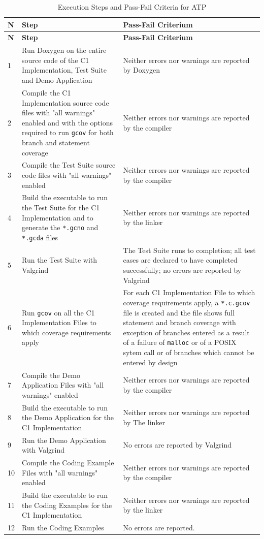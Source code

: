 \documentclass[manual]{../fwprofile}
\begin{document}
\begin{longtable}{|l|p{5.2cm}|p{5.2cm}|}
\caption{Execution Steps and Pass-Fail Criteria for ATP}\label{tab:atp} \\
\hline
\rowcolor{gray}
\textbf{N} & \textbf{Step} & \textbf{Pass-Fail Criterium} \\
\hline\hline
\endfirsthead
\rowcolor{gray}
\textbf{N} & \textbf{Step} & \textbf{Pass-Fail Criterium} \\
\hline\hline
\endhead

1 & Run Doxygen on the entire source code of the C1 Implementation, Test Suite and Demo Application &
Neither errors nor warnings are reported by Doxygen \\
\hline
2 & Compile the C1 Implementation source code files with "all warnings" enabled and with the options required to run \texttt{gcov} for both branch and statement coverage &
Neither errors nor warnings are reported by the compiler \\
\hline
3 & Compile the Test Suite source code files with "all warnings" enabled &
Neither errors nor warnings are reported by the compiler \\
\hline
4 & Build the executable to run the Test Suite for the C1 Implementation and to generate the \texttt{*.gcno} and \texttt{*.gcda} files &
Neither errors nor warnings are reported by the linker \\
\hline
5 & Run the Test Suite with Valgrind &
The Test Suite runs to completion; all test cases are declared to have completed successfully; no errors are reported by Valgrind \\
\hline
6 & Run \texttt{gcov} on all the C1 Implementation Files to which coverage requirements apply &
For each C1 Implementation File to which coverage requirements apply, a \texttt{*.c.gcov}
file is created and the file shows full statement and branch coverage with exception of
branches entered as a result of a failure of \texttt{malloc} or of a POSIX sytem call or of branches which cannot be entered by design \\
\hline
7 & Compile the Demo Application Files with "all warnings" enabled &
Neither errors nor warnings are reported by the compiler \\
\hline
8 & Build the executable to run the Demo Application for the C1 Implementation &
Neither errors nor warnings are reported by The linker \\
\hline
9 & Run the Demo Application with Valgrind &
No errors are reported by Valgrind \\
10 & Compile the Coding Example Files with "all warnings" enabled &
Neither errors nor warnings are reported by the compiler \\
\hline
11 & Build the executable to run the Coding Examples for the C1 Implementation &
Neither errors nor warnings are reported by the linker \\
\hline
12 & Run the Coding Examples &
No errors are reported. \\
\hline
\end{longtable}
\end{document}
